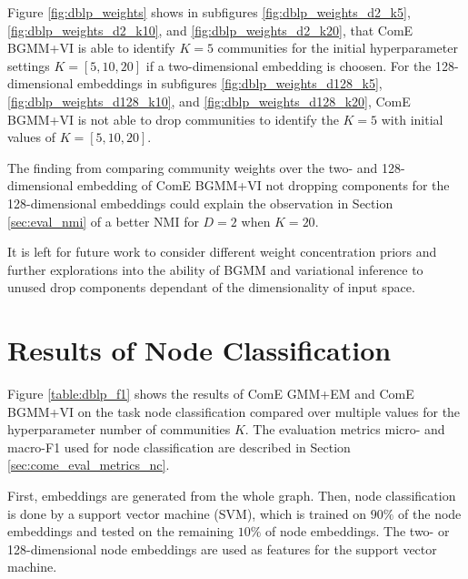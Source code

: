 \documentclass[conference]{IEEEtran}
\begin{document}
Figure \ref{fig:dblp_weights} shows in subfigures \ref{fig:dblp_weights_d2_k5}, \ref{fig:dblp_weights_d2_k10}, and \ref{fig:dblp_weights_d2_k20}, that ComE BGMM+VI is able to identify $K=5$ communities for the initial hyperparameter settings $K=[5, 10, 20]$ if a two-dimensional embedding is choosen. For the 128-dimensional embeddings in subfigures \ref{fig:dblp_weights_d128_k5}, \ref{fig:dblp_weights_d128_k10}, and \ref{fig:dblp_weights_d128_k20}, ComE BGMM+VI is not able to drop communities to identify the $K=5$ with initial values of $K=[5,10,20]$.

The finding from comparing community weights over the two- and 128-dimensional embedding of ComE BGMM+VI not dropping components for the 128-dimensional embeddings could explain the observation in Section \ref{sec:eval_nmi} of a better NMI for $D=2$ when $K=20$.

It is left for future work to consider different weight concentration priors and further explorations into the ability of BGMM and variational inference to unused drop components dependant of the dimensionality of input space.


\section{Results of Node Classification}

Figure \ref{table:dblp_f1} shows the results of ComE GMM+EM and ComE BGMM+VI on the task node classification compared over multiple values for the hyperparameter number of communities $K$. The evaluation metrics micro- and macro-F1 used for node classification are described in Section \ref{sec:come_eval_metrics_nc}.

First, embeddings are generated from the whole graph. Then, node classification is done by a support vector machine (SVM), which is trained on $90\%$ of the node embeddings and tested on the remaining $10\%$ of node embeddings. The two- or 128-dimensional node embeddings are used as features for the support vector machine.
\end{document}
